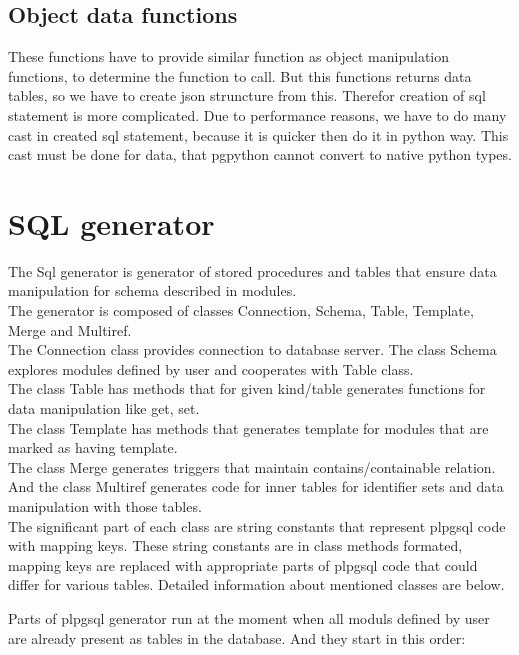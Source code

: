 \documentclass[deska]{subfiles}
\begin{document}
\subsection{Object data functions}
These functions have to provide similar function as object manipulation functions, to determine the function to call. But this functions returns data tables, so we have to create json struncture from this. Therefor creation of sql statement is more complicated. Due to performance reasons, we have to do many cast in created sql statement, because it is quicker then do it in python way. This cast must be done for data, that pgpython cannot convert to native python types.

\section{SQL generator}
The Sql generator is generator of stored procedures and tables that ensure data manipulation for schema described in modules.\\

The generator is composed of classes Connection, Schema, Table, Template, Merge and Multiref.\\
The Connection class provides connection to database server.
The class Schema explores modules defined by user and cooperates with Table class.\\
The class Table has methods that for given kind/table generates functions for data manipulation like get, set.\\
The class Template has methods that generates template for modules that are marked as having template.\\
The class Merge generates triggers that maintain contains/containable relation.\\
And the class Multiref generates code for inner tables for identifier sets and data manipulation with those tables.\\

The significant part of each class are string constants that represent plpgsql code with mapping keys. These string constants are in class methods formated, mapping keys are replaced with appropriate parts of plpgsql code that could differ for various tables.
Detailed information about mentioned classes are below.

Parts of plpgsql generator run at the moment when all moduls defined by user are already present as tables in the database. And they start in this order:
\end{document}
